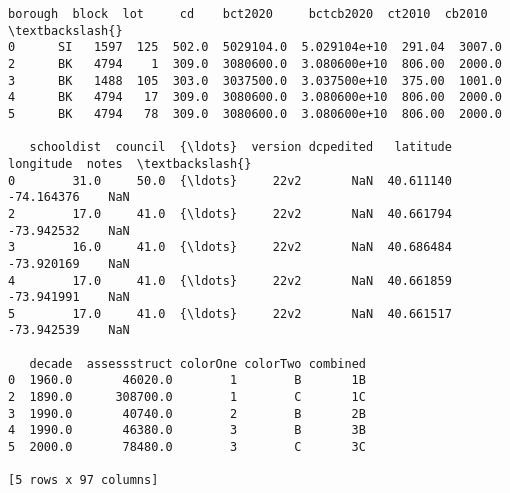 \documentclass[11pt]{article}
\begin{document}
            \begin{tcolorbox}[breakable, size=fbox, boxrule=.5pt, pad at break*=1mm, opacityfill=0]
\begin{Verbatim}[commandchars=\\\{\}]
  borough  block  lot     cd    bct2020     bctcb2020  ct2010  cb2010  \textbackslash{}
0      SI   1597  125  502.0  5029104.0  5.029104e+10  291.04  3007.0
2      BK   4794    1  309.0  3080600.0  3.080600e+10  806.00  2000.0
3      BK   1488  105  303.0  3037500.0  3.037500e+10  375.00  1001.0
4      BK   4794   17  309.0  3080600.0  3.080600e+10  806.00  2000.0
5      BK   4794   78  309.0  3080600.0  3.080600e+10  806.00  2000.0

   schooldist  council  {\ldots}  version dcpedited   latitude  longitude  notes  \textbackslash{}
0        31.0     50.0  {\ldots}     22v2       NaN  40.611140 -74.164376    NaN
2        17.0     41.0  {\ldots}     22v2       NaN  40.661794 -73.942532    NaN
3        16.0     41.0  {\ldots}     22v2       NaN  40.686484 -73.920169    NaN
4        17.0     41.0  {\ldots}     22v2       NaN  40.661859 -73.941991    NaN
5        17.0     41.0  {\ldots}     22v2       NaN  40.661517 -73.942539    NaN

   decade  assessstruct colorOne colorTwo combined
0  1960.0       46020.0        1        B       1B
2  1890.0      308700.0        1        C       1C
3  1990.0       40740.0        2        B       2B
4  1990.0       46380.0        3        B       3B
5  2000.0       78480.0        3        C       3C

[5 rows x 97 columns]
\end{Verbatim}
\end{tcolorbox}
         
            
    
    \begin{center}
    \end{center}
    { \hspace*{\fill} \\}
    


    
    
    
\end{document}
